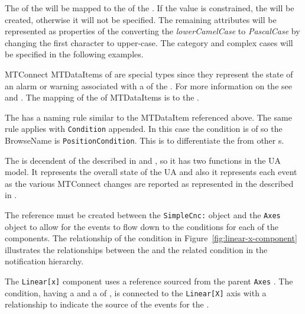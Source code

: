 The  of the  will be mapped to the   of the . If the value is constrained, the  will be created, otherwise it will not be specified. The remaining attributes will be represented as properties of the  converting the \textit{lowerCamelCase} to \textit{PascalCase} by changing the first character to upper-case. The  category and complex cases will be specified in the following examples.

MTConnect \glspl{MTDataItem} of   are special types since they represent the state of an alarm or warning associated with a  of the . For more information on the  see \cite{MTCPart2} and \cite{MTCPart3}. The mapping of the   of \glspl{MTDataItem} is to the .

The  has a naming rule similar to the \gls{MTDataItem} referenced above. The same rule applies with \texttt{Condition} appended. In this case the condition is of   so the \gls{BrowseName} is \texttt{PositionCondition}. This is to differentiate the  from other s.

The  is decendent of the  described in \cite{UAPart5} and \cite{UAPart9}, so it has two functions in the UA model. It represents the overall state of the UA  and also it represents each event as the various MTConnect  changes are reported as represented in the  described in \cite{MTCPart3}.

The  reference must be created between the \texttt{SimpleCnc:} object and the \texttt{Axes} object to allow for the events to flow down to the conditions for each of the components. The relationship of the condition in Figure~\ref{fig:linear-x-component} illustrates the relationships between the  and the related condition in the notification hierarchy.

The \texttt{Linear[x]} component uses a  reference sourced from the parent \texttt{Axes} . The condition, having a  and a  of , is connected to the \texttt{Linear[X]} axis with a  relationship to indicate the source of the events for the .

